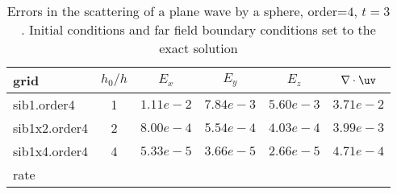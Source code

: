 


\begin{table}[hbt]
\begin{center}
\begin{tabular}{|l|c|c|c|c|c|} \hline\hline 
grid           & $h_0/h$ &    $E_x$       &  $E_y$       & $E_z$        & $\grad\cdot\uv$\\ \hline 
sib1.order4    &   1     &  $1.11e-2$  & $7.84e-3$ & $5.60e-3$ & $3.71e-2$   \\ \hline
sib1x2.order4  &   2     &  $8.00e-4$  & $5.54e-4$ & $4.03e-4$ & $3.99e-3$   \\ \hline
sib1x4.order4  &   4     &  $5.33e-5$  & $3.66e-5$ & $2.66e-5$ & $4.71e-4$   \\ \hline
   rate        &         &  $       $  & $       $ & $       $ & $       $   \\ \hline
\end{tabular}
\caption{Errors in the scattering of a plane wave by a sphere, order=$4$, $t=3$. Initial conditions and
   far field boundary conditions set to the exact solution}\label{table:scatSphere}
\end{center}
\end{table}

